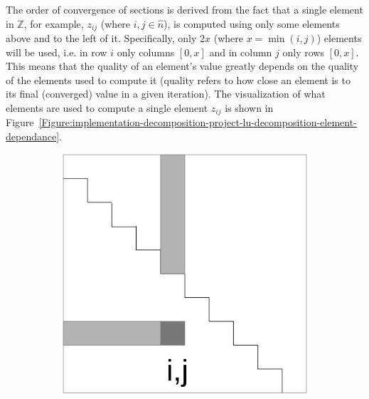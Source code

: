 The order of convergence of sections is derived from the fact that a single element in $ \mathbb{Z} $, for example, $ z_{ij} $ (where $ i,j \in \widehat{n} $), is computed using only some elements above and to the left of it. Specifically, only $ 2x $ (where $ x = \min(i, j) $) elements will be used, i.e. in row $ i $ only columns $ \left[0, x\right] $ and in column $ j $ only rows $ \left[0, x\right] $. This means that the quality of an element's value greatly depends on the quality of the elements used to compute it (quality refers to how close an element is to its final (converged) value in a given iteration). The visualization of what elements are used to compute a single element $ z_{ij} $ is shown in Figure~\ref{Figure:implementation-decomposition-project-lu-decomposition-element-dependance}.

\begin{figure}[h!]
	\centering
	\begin{subfigure}{.5\textwidth}
		\centering
		\includegraphics[width=.8\textwidth, keepaspectratio]{images/ch2/LU_decomposition_crout_method_visualization_elements_used_simple_lower.png}
		\label{Figure:implementation-decomposition-project-lu-decomposition-element-dependance-lower}
	\end{subfigure}%
	\begin{subfigure}{.5\textwidth}
		\centering

\end{subfigure}
\end{figure}
